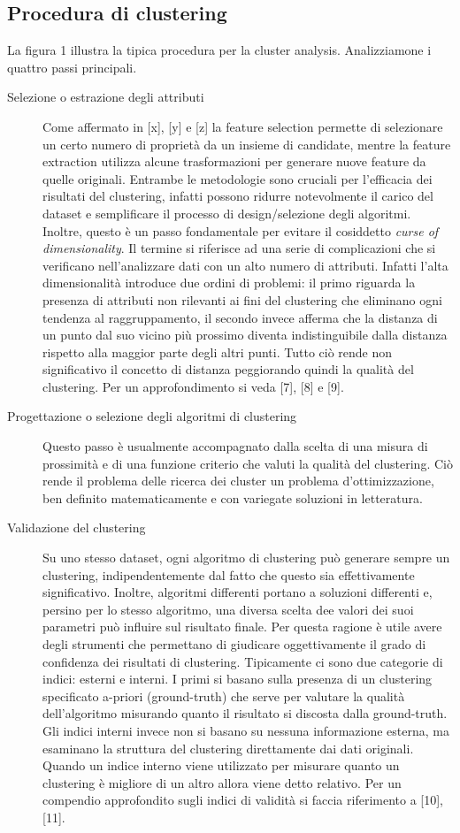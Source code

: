 \subsection{Procedura di clustering}
\label{procedura_clustering}
La figura 1 illustra la tipica procedura per la cluster analysis. Analizziamone i quattro passi principali.

\begin{description}
\item[Selezione o estrazione degli attributi] Come affermato in [x], [y] e [z] la feature selection permette di selezionare un certo numero di propriet\`a da un insieme di candidate, mentre la feature extraction utilizza alcune trasformazioni per generare nuove feature da quelle originali. Entrambe le metodologie sono cruciali per l'efficacia dei risultati del clustering, infatti possono ridurre notevolmente il carico del dataset e semplificare il processo di design/selezione degli algoritmi. Inoltre, questo \`e un passo fondamentale per evitare il cosiddetto \textit{curse of dimensionality}. Il termine si riferisce ad una serie di complicazioni che si verificano nell'analizzare dati con un alto numero di attributi. Infatti l'alta dimensionalit\`a introduce due ordini di problemi: il primo riguarda la presenza di attributi non rilevanti ai fini del clustering che eliminano ogni tendenza al raggruppamento, il secondo invece afferma che la distanza di un punto dal suo vicino pi\`u prossimo diventa indistinguibile dalla distanza rispetto alla maggior parte degli altri punti. Tutto ci\`o rende non significativo il concetto di distanza peggiorando quindi la qualit\`a del clustering. Per un approfondimento si veda [7], [8] e [9]. 
\item[Progettazione o selezione degli algoritmi di clustering] Questo passo \`e usualmente accompagnato dalla scelta di una misura di prossimit\`a e di una funzione criterio che valuti la qualit\`a del clustering. Ci\`o rende il problema delle ricerca dei cluster un problema d'ottimizzazione, ben definito matematicamente e con variegate soluzioni in letteratura. 
\item[Validazione del clustering] Su uno stesso dataset, ogni algoritmo di clustering pu\`o generare sempre un clustering, indipendentemente dal fatto che questo sia effettivamente significativo. Inoltre, algoritmi differenti portano a soluzioni differenti e, persino per lo stesso algoritmo, una diversa scelta dee valori dei suoi parametri pu\`o influire sul risultato finale. Per questa ragione \`e utile avere degli strumenti che permettano di giudicare oggettivamente il grado di confidenza dei risultati di clustering. Tipicamente ci sono due categorie di indici: esterni e interni. I primi si basano sulla presenza di un clustering specificato a-priori (ground-truth) che serve per valutare la qualit\`a dell'algoritmo misurando quanto il risultato si discosta dalla ground-truth. Gli indici interni invece non si basano su nessuna informazione esterna, ma esaminano la struttura del clustering direttamente dai dati originali. Quando un indice interno viene utilizzato per misurare quanto un clustering \`e migliore di un altro allora viene detto relativo. Per un compendio approfondito sugli indici di validit\`a si faccia riferimento a [10], [11].

\end{description}
